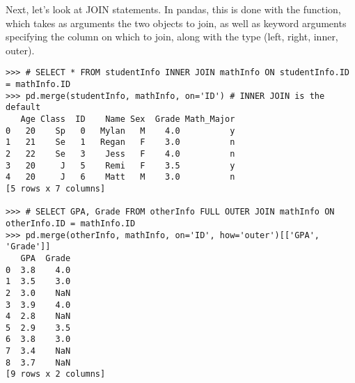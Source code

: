 Next, let's look at JOIN statements.
In pandas, this is done with the  function,
which takes as arguments the two  objects to join, as well as keyword arguments specifying
the column on which to join, along with the type (left, right, inner, outer).

\begin{lstlisting}
>>> # SELECT * FROM studentInfo INNER JOIN mathInfo ON studentInfo.ID = mathInfo.ID
>>> pd.merge(studentInfo, mathInfo, on='ID') # INNER JOIN is the default
   Age Class  ID    Name Sex  Grade Math_Major
0   20    Sp   0   Mylan   M    4.0          y
1   21    Se   1   Regan   F    3.0          n
2   22    Se   3    Jess   F    4.0          n
3   20     J   5    Remi   F    3.5          y
4   20     J   6    Matt   M    3.0          n
[5 rows x 7 columns]

>>> # SELECT GPA, Grade FROM otherInfo FULL OUTER JOIN mathInfo ON otherInfo.ID = mathInfo.ID
>>> pd.merge(otherInfo, mathInfo, on='ID', how='outer')[['GPA', 'Grade']]
   GPA  Grade
0  3.8    4.0
1  3.5    3.0
2  3.0    NaN
3  3.9    4.0
4  2.8    NaN
5  2.9    3.5
6  3.8    3.0
7  3.4    NaN
8  3.7    NaN
[9 rows x 2 columns]
\end{lstlisting}

